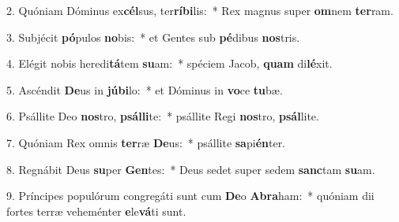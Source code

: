 2. Quóniam Dóminus ex\textbf{cél}sus, ter\textbf{rí}\textbf{bi}lis:~*  Rex magnus super \textbf{om}nem \textbf{ter}ram.\

3. Subjécit \textbf{pó}pulos \textbf{no}bis:~*  et Gentes sub \textbf{pé}dibus \textbf{nos}tris.\

4. Elégit nobis heredi\textbf{tá}tem \textbf{su}am:~*  spéciem Jacob, \textbf{quam} di\textbf{lé}xit.\

5. Ascéndit \textbf{De}us in \textbf{jú}\textbf{bi}lo:~*  et Dóminus in \textbf{vo}ce \textbf{tu}bæ.\

6. Psállite Deo \textbf{nos}tro, \textbf{psál}\textbf{li}te:~*  psállite Regi \textbf{nos}tro, \textbf{psál}lite.\

7. Quóniam Rex omnis \textbf{ter}ræ \textbf{De}us:~*  psállite \textbf{sa}pi\textbf{én}ter.\

8. Regnábit Deus \textbf{su}per \textbf{Gen}tes:~*  Deus sedet super sedem \textbf{sanc}tam \textbf{su}am.\

9. Príncipes populórum congregáti sunt cum \textbf{De}o \textbf{A}\textbf{bra}ham:~*  quóniam dii fortes terræ veheménter \textbf{e}le\textbf{vá}ti sunt.\

